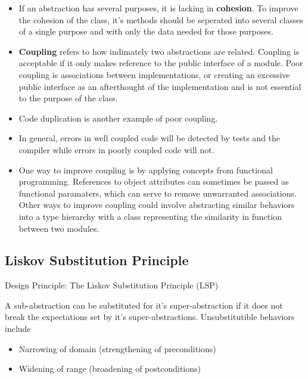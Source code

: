 \documentclass[letterpaper] {article}
\begin{document}
    \begin{itemize}
        \item If an abstraction has several purposes, it is lacking in \textbf{cohesion}. To improve the cohesion of the class, it's methods should be seperated into several classes of a single purpose and with only the data needed for those purposes. 
        \item \textbf{Coupling} refers to how indimately two abstractions are related. Coupling is acceptable if it only makes reference to the public interface of a module. Poor coupling is associations between implementations, or creating an excessive public interface as an afterthought of the implementation and is not essential to the purpose of the class. 
        \item Code duplication is another example of poor coupling. 
        \item In general, errors in well coupled code will be detected by tests and the compiler while errors in poorly coupled code will not. 
        \item One way to improve coupling is by applying concepts from functional programming. References to object attributes can sometimes be passed as functional paramaters, which can serve to remove unwarranted associations. Other ways to improve coupling could involve abstracting similar behaviors into a type hierarchy with a class representing the similarity in function between two modules. 
    \end{itemize}

    \subsection{Liskov Substitution Principle}
    \begin{framed}
        \begin{center}
            Design Principle: The Liskov Substitution Principle (LSP)
        \end{center}
        A sub-abstraction can be substituted for it's super-abstraction if it does not break the expectations set by it's super-abstractions. Unsubstitutible behaviors include
        \begin{itemize}
            \item Narrowing of domain (strengthening of preconditions)
            \item Widening of range (broadening of postconditions)
        \end{itemize}
    \end{framed}
\end{document}
